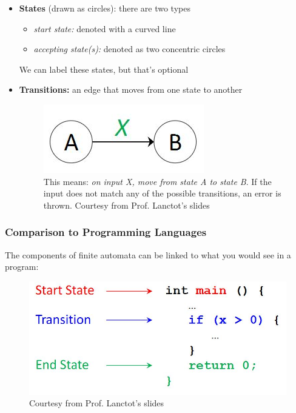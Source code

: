\documentclass{report}
\begin{document}
\begin{itemize}
\item \textbf{States} (drawn as circles): there are two types
\begin{itemize}
\item \textit{start state:} denoted with a curved line
\item \textit{accepting state(s):} denoted as two concentric circles
\end{itemize}
We can label these states, but that's optional\newpage
\item \textbf{Transitions:} an edge that moves from one state to another
\begin{figure}[ht]
\begin{center}
\includegraphics[scale=0.5]{input1.jpg}
\end{center}
\caption{This means: \textit{on input X, move from state A to state B}. If the input does not match any of the possible transitions, an error is thrown. Courtesy from Prof. Lanctot's slides}
\end{figure}
\end{itemize}
\subsubsection{Comparison to Programming Languages}
The components of finite automata can be linked to what you would see in a program:
\begin{figure}[ht]
\begin{center}
\includegraphics[scale=0.3]{code.jpg}
\end{center}
\caption{Courtesy from Prof. Lanctot's slides}
\end{figure}
\end{document}
